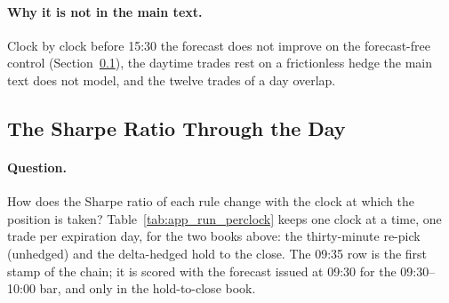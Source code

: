 \paragraph{Why it is not in the main text.} Clock by clock before 15:30 the
forecast does not improve on the forecast-free control
(Section~\ref{sec:app_run_perclock}), the daytime trades rest on a
frictionless hedge the main text does not model, and the twelve trades of a day
overlap.

\subsection{The Sharpe Ratio Through the Day}
\label{sec:app_run_perclock}

\paragraph{Question.} How does the Sharpe ratio of each rule change with the
clock at which the position is taken? Table~\ref{tab:app_run_perclock} keeps
one clock at a time, one trade per expiration day, for the two books above:
the thirty-minute re-pick (unhedged) and the delta-hedged hold to the close.
The 09:35 row is the first stamp of the chain; it is scored with the forecast
issued at 09:30 for the 09:30--10:00 bar, and only in the hold-to-close book.

